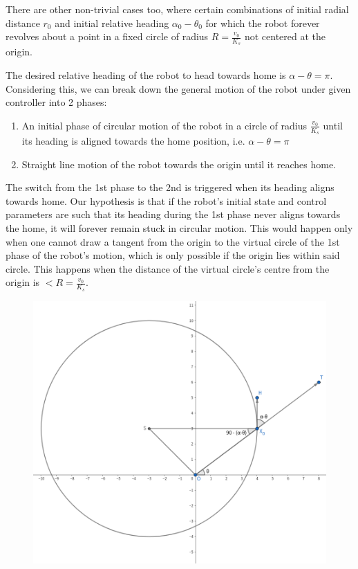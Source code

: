 \documentclass[12pt]{article}
\begin{document}
There are other non-trivial cases too, where certain combinations of initial radial distance \(r_0\) and initial relative heading \(\alpha_0-\theta_0\) for which the robot forever revolves about a point in a fixed circle of radius \(\displaystyle R=\frac{v_0}{K_s}\) not centered at the origin.

The desired relative heading of the robot to head towards home is \(\alpha-\theta=\pi\). Considering this, we can break down the general motion of the robot under given controller into 2 phases:
\begin{enumerate}
	\item An initial phase of circular motion of the robot in a circle of radius \(\frac{v_0}{K_s}\) until its heading is aligned towards the home position, i.e. \(\alpha-\theta=\pi\)
	\item Straight line motion of the robot towards the origin until it reaches home.
\end{enumerate}
The switch from the 1st phase to the 2nd is triggered when its heading aligns towards home. Our hypothesis is that if the robot's initial state and control parameters are such that its heading during the 1st phase never aligns towards the home, it will forever remain stuck in circular motion. This would happen only when one cannot draw a tangent from the origin to the virtual circle of the 1st phase of the robot's motion, which is only possible if the origin lies within said circle. This happens when the distance of the virtual circle's centre from the origin is \(\displaystyle<R=\frac{v_0}{K_s}\).

\begin{figure}[ht!]
	\centering
	\includegraphics[width=0.75\linewidth]{images/diagram.png}
\end{figure}
\end{document}
